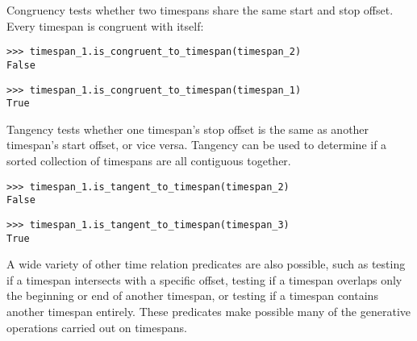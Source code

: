 \noindent Congruency tests whether two timespans share the same start and stop
offset. Every timespan is congruent with itself:

\begin{comment}
<abjad>
timespan_1.is_congruent_to_timespan(timespan_2)
timespan_1.is_congruent_to_timespan(timespan_1)
</abjad>
\end{comment}

\begin{singlespacing}
\vspace{-0.5\baselineskip}
\begin{lstlisting}
>>> timespan_1.is_congruent_to_timespan(timespan_2)
False
\end{lstlisting}
\begin{lstlisting}
>>> timespan_1.is_congruent_to_timespan(timespan_1)
True
\end{lstlisting}
\end{singlespacing}

\noindent Tangency tests whether one timespan's stop offset is the same as
another timespan's start offset, or vice versa. Tangency can be used to
determine if a sorted collection of timespans are all contiguous together.

\begin{comment}
<abjad>
timespan_1.is_tangent_to_timespan(timespan_2)
timespan_1.is_tangent_to_timespan(timespan_3)
</abjad>
\end{comment}

\begin{singlespacing}
\vspace{-0.5\baselineskip}
\begin{lstlisting}
>>> timespan_1.is_tangent_to_timespan(timespan_2)
False
\end{lstlisting}
\begin{lstlisting}
>>> timespan_1.is_tangent_to_timespan(timespan_3)
True
\end{lstlisting}
\end{singlespacing}

\noindent A wide variety of other time relation predicates are also possible,
such as testing if a timespan intersects with a specific offset, testing if a
timespan overlaps only the beginning or end of another timespan, or testing if
a timespan contains another timespan entirely. These predicates make possible
many of the generative operations carried out on timespans.

